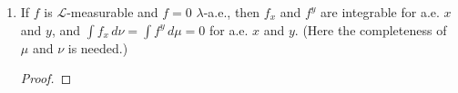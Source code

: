 \documentclass[11pt,oneside,english]{amsart}
\theoremstyle{definition}
\newcommand{\MC}[1]{\mathcal{#1}}
\begin{document}
\begin{enumerate}
\begin{enumerate}
\begin{proof}
Suppose $\mu\times \nu(E)=0$. Then $0=\int\nu(E_x)\,d\mu(x)=\int\mu(E^y)\,d\nu(y)$, which implies that $\nu(E^x)=\mu(E^y)=0$ for a.e. $x$ and $y$ by Proposition 2.16.
\end{proof}

\item If $f$ is $\MC{L}$-measurable and $f=0$ $\lambda$-a.e., then $f_x$ and $f^y$ are integrable for a.e. $x$ and $y$, and $\int f_x\,d\nu =\int f^y\,d\mu=0$ for a.e. $x$ and $y$. (Here the completeness of $\mu$ and $\nu$ is needed.)

\begin{proof}

\end{proof}

\end{enumerate}


\end{enumerate}
\end{document}
